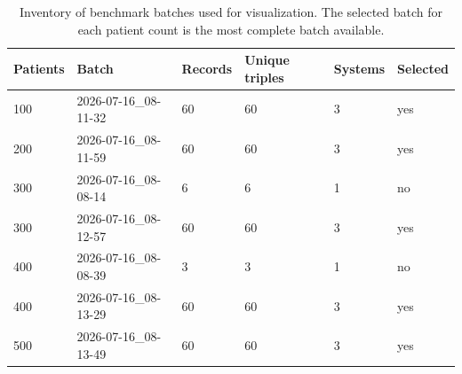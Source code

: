 \documentclass{article}
\begin{document}
\begin{table}[htbp]
  \centering
  \caption{Inventory of benchmark batches used for visualization. The selected batch for each patient count is the most complete batch available.}
  \label{tab:benchmark_inventory}
  \begin{tabular}{llllll}
    \toprule
    Patients & Batch & Records & Unique triples & Systems & Selected \\
    \midrule
    100 & 2026-07-16_08-11-32 & 60 & 60 & 3 & yes \\
    200 & 2026-07-16_08-11-59 & 60 & 60 & 3 & yes \\
    300 & 2026-07-16_08-08-14 & 6 & 6 & 1 & no \\
    300 & 2026-07-16_08-12-57 & 60 & 60 & 3 & yes \\
    400 & 2026-07-16_08-08-39 & 3 & 3 & 1 & no \\
    400 & 2026-07-16_08-13-29 & 60 & 60 & 3 & yes \\
    500 & 2026-07-16_08-13-49 & 60 & 60 & 3 & yes \\
    \bottomrule
  \end{tabular}
\end{table}
\end{document}
